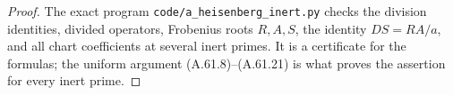 \begin{proof}
The exact program \texttt{code/a\_heisenberg\_inert.py}
checks the
division identities, divided operators,
Frobenius roots \(R,A,S\), the identity
\(DS=RA/a\), and all chart coefficients at
several inert primes. It is a certificate
for the formulas; the uniform argument
(A.61.8)--(A.61.21) is what proves the
assertion for every inert prime.
\end{proof}
